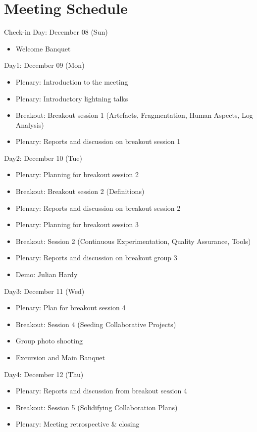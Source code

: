 \documentclass[a4paper]{article}
\begin{document}
\clearpage

\section{Meeting Schedule}

\begin{bfseries}
Check-in Day: December 08 (Sun)
\end{bfseries}
\begin{itemize}
\item Welcome Banquet
\end{itemize}
\begin{bfseries}
{Day1: December 09 (Mon)}
\end{bfseries}
\begin{itemize}
\item Plenary: Introduction to the meeting
\item Plenary: Introductory lightning talks
\item Breakout: Breakout session 1 (Artefacts, Fragmentation, Human Aspects, Log Analysis)
\item Plenary: Reports and discussion on breakout session 1
\end{itemize}
\begin{bfseries}
Day2: December 10 (Tue)
\end{bfseries}
\begin{itemize}
\item Plenary: Planning for breakout session 2 
\item Breakout: Breakout session 2 (Definitions)
\item Plenary: Reports and discussion on breakout session 2
\item Plenary: Planning for breakout session 3
\item Breakout: Session 2 (Continuous Experimentation, Quality Assurance, Tools)
\item Plenary: Reports and discussion on breakout group 3
\item Demo: Julian Hardy
\end{itemize}
\begin{bfseries}
Day3: December 11 (Wed)
\end{bfseries}
\begin{itemize}
\item Plenary: Plan for breakout session 4
\item Breakout: Session 4 (Seeding Collaborative Projects)
\item Group photo shooting
\item Excursion and Main Banquet
\end{itemize}
\begin{bfseries}
Day4: December 12 (Thu)
\end{bfseries}
\begin{itemize}
\item Plenary: Reports and discussion from breakout session 4
\item Breakout: Session 5 (Solidifying Collaboration Plans)
\item Plenary: Meeting retrospective \& closing
\end{itemize}
\end{document}
